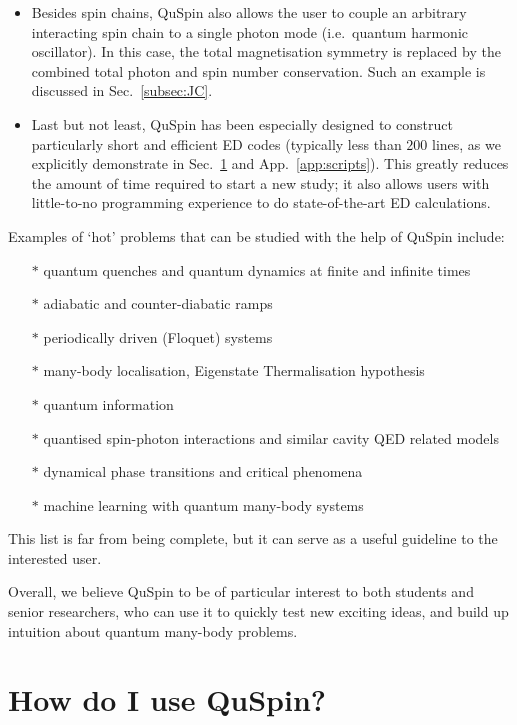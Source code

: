 \documentclass{SciPost}
\newcommand\0{\scalebox{-1}[1]{0}}
\begin{document}
\begin{itemize}
	\item Besides spin chains, QuSpin also allows the user to couple an arbitrary interacting spin chain to a single photon mode (i.e.~quantum harmonic oscillator). In this case, the total magnetisation symmetry is replaced by the combined total photon and spin number conservation. Such an example is discussed in Sec.~\ref{subsec:JC}.
	\item Last but not least, QuSpin has been especially designed to construct particularly short and efficient ED codes (typically less than $200$ lines, as we explicitly demonstrate in Sec.~\ref{sec:examples} and App.~\ref{app:scripts}). This greatly reduces the amount of time required to start a new study; it also allows users with little-to-no programming experience to do state-of-the-art ED calculations.
\end{itemize}

\noindent Examples of `hot' problems that can be studied with the help of QuSpin include:
\begin{itemize}
	\item[$\ast$] quantum quenches and quantum dynamics at finite and infinite times
	\item[$\ast$] adiabatic and counter-diabatic ramps 
	\item[$\ast$] periodically driven (Floquet) systems
	\item[$\ast$] many-body localisation, Eigenstate Thermalisation hypothesis
	\item[$\ast$] quantum information
	\item[$\ast$] quantised spin-photon interactions and similar cavity QED related models
	\item[$\ast$] dynamical phase transitions and critical phenomena
	\item[$\ast$] machine learning with quantum many-body systems
\end{itemize}
This list is far from being complete, but it can serve as a useful guideline to the interested user. 

Overall, we believe QuSpin to be of particular interest to both students and senior researchers, who can use it to quickly test new exciting ideas, and build up intuition about quantum many-body problems.


\section{How do I use QuSpin?}
\label{sec:examples}
\end{document}
